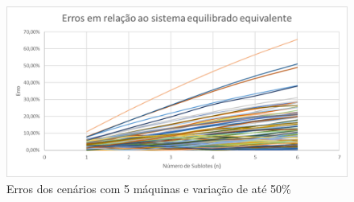\begin{figure}[!ht]
    \centering
    \includegraphics[width=12cm]{Resultados/Figuras/e05_50}
    \caption{Erros dos cenários com 5 máquinas e variação de até 50\%}
    \label{fig:e05_50}
\end{figure}